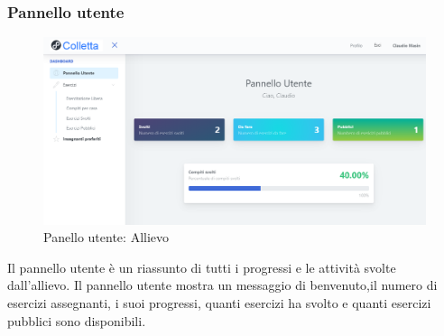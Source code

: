             
        \subsubsection{Pannello utente}
			\begin{figure}[H]
        		\centering
        		\includegraphics[width=1\linewidth]{sez/img/studente/panelloUtente.PNG} 
        		\caption{Panello utente: Allievo}\label{fig:1}
    		\end{figure}        
        
          Il pannello utente è un riassunto di tutti i progressi e le attività svolte dall'allievo. Il pannello utente mostra un messaggio di benvenuto,il numero di esercizi assegnanti, i suoi progressi, quanti esercizi ha svolto e quanti esercizi pubblici sono disponibili. 
          
